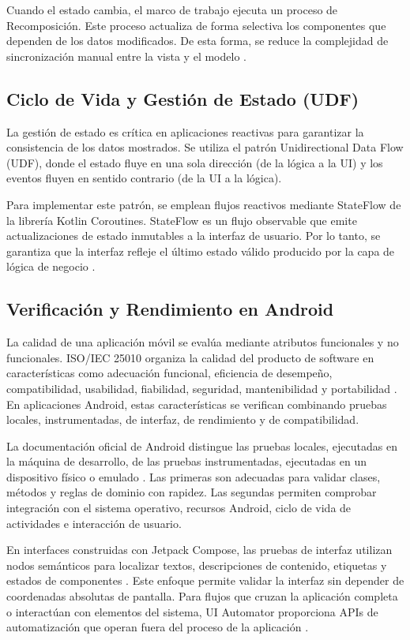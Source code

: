 Cuando el estado cambia, el marco de trabajo ejecuta un proceso de Recomposición. Este proceso actualiza de forma selectiva los componentes que dependen de los datos modificados. De esta forma, se reduce la complejidad de sincronización manual entre la vista y el modelo \cite{gupta2022modern}.

\subsection{Ciclo de Vida y Gestión de Estado (UDF)}
La gestión de estado es crítica en aplicaciones reactivas para garantizar la consistencia de los datos mostrados. Se utiliza el patrón Unidirectional Data Flow (UDF), donde el estado fluye en una sola dirección (de la lógica a la UI) y los eventos fluyen en sentido contrario (de la UI a la lógica).

Para implementar este patrón, se emplean flujos reactivos mediante StateFlow de la librería Kotlin Coroutines. StateFlow es un flujo observable que emite actualizaciones de estado inmutables a la interfaz de usuario. Por lo tanto, se garantiza que la interfaz refleje el último estado válido producido por la capa de lógica de negocio \cite{reactive_kotlin}.

\subsection{Verificación y Rendimiento en Android}
La calidad de una aplicación móvil se evalúa mediante atributos funcionales y no funcionales. ISO/IEC 25010 organiza la calidad del producto de software en características como adecuación funcional, eficiencia de desempeño, compatibilidad, usabilidad, fiabilidad, seguridad, mantenibilidad y portabilidad \cite{iso25010-2011}. En aplicaciones Android, estas características se verifican combinando pruebas locales, instrumentadas, de interfaz, de rendimiento y de compatibilidad.

La documentación oficial de Android distingue las pruebas locales, ejecutadas en la máquina de desarrollo, de las pruebas instrumentadas, ejecutadas en un dispositivo físico o emulado \cite{android_testing_fundamentals}. Las primeras son adecuadas para validar clases, métodos y reglas de dominio con rapidez. Las segundas permiten comprobar integración con el sistema operativo, recursos Android, ciclo de vida de actividades e interacción de usuario.

En interfaces construidas con Jetpack Compose, las pruebas de interfaz utilizan nodos semánticos para localizar textos, descripciones de contenido, etiquetas y estados de componentes \cite{android_compose_testing}. Este enfoque permite validar la interfaz sin depender de coordenadas absolutas de pantalla. Para flujos que cruzan la aplicación completa o interactúan con elementos del sistema, UI Automator proporciona APIs de automatización que operan fuera del proceso de la aplicación \cite{android_uiautomator}.

